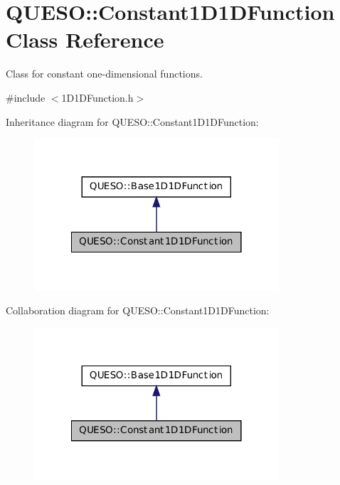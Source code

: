 \hypertarget{class_q_u_e_s_o_1_1_constant1_d1_d_function}{\section{Q\-U\-E\-S\-O\-:\-:Constant1\-D1\-D\-Function Class Reference}
\label{class_q_u_e_s_o_1_1_constant1_d1_d_function}
}


Class for constant one-\/dimensional functions.  




{\ttfamily \#include $<$1\-D1\-D\-Function.\-h$>$}



Inheritance diagram for Q\-U\-E\-S\-O\-:\-:Constant1\-D1\-D\-Function\-:
\nopagebreak
\begin{figure}[H]
\begin{center}
\leavevmode
\includegraphics[width=258pt]{class_q_u_e_s_o_1_1_constant1_d1_d_function__inherit__graph}
\end{center}
\end{figure}


Collaboration diagram for Q\-U\-E\-S\-O\-:\-:Constant1\-D1\-D\-Function\-:
\nopagebreak
\begin{figure}[H]
\begin{center}
\leavevmode
\includegraphics[width=258pt]{class_q_u_e_s_o_1_1_constant1_d1_d_function__coll__graph}
\end{center}
\end{figure}
